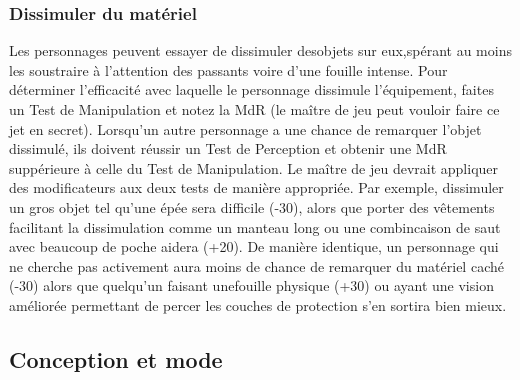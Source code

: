 \subsubsection{Dissimuler du matériel} 

Les personnages peuvent essayer de dissimuler desobjets sur eux,spérant au moins les soustraire à l'attention des passants voire d'une fouille intense. Pour déterminer l'efficacité avec laquelle le personnage dissimule l'équipement, faites un Test de Manipulation et notez la MdR (le maître de jeu peut vouloir faire ce jet en secret). Lorsqu'un autre personnage a une chance de remarquer l'objet dissimulé, ils doivent réussir un Test de Perception et obtenir une MdR suppérieure à celle du Test de Manipulation. Le maître de jeu devrait appliquer des modificateurs aux deux tests de manière appropriée. Par exemple, dissimuler un gros objet tel qu'une épée sera difficile (-30), alors que porter des vêtements facilitant la dissimulation comme un manteau long ou une combincaison de saut avec beaucoup de poche aidera (+20). De manière identique, un personnage qui ne cherche pas activement  aura moins de chance de remarquer du matériel caché (-30) alors que quelqu'un faisant unefouille physique (+30) ou ayant une vision améliorée permettant de percer les couches de protection s'en sortira bien mieux. 

\subsection{Conception et mode} \label{sec:design-fashion} 

